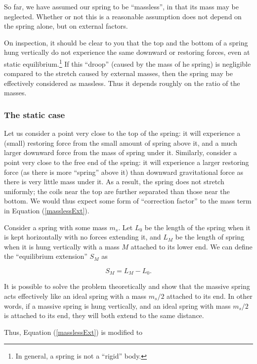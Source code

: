 \begin{refsection}
So far, we have assumed our spring to be ``massless'', in that its mass may be neglected. Whether or not this is a reasonable assumption does not depend on the spring alone, but on external factors. 

On inspection, it should be clear to you that the top and the bottom of a spring hung vertically do not experience the same downward or restoring forces, even at static equilibrium.\footnote{In general, a spring is not a ``rigid'' body.} If this ``droop'' (caused by the mass of he spring) is negligible compared to the stretch caused by external masses, then the spring may be effectively considered as massless. Thus it depends roughly on the ratio of the masses.


\subsubsection*{The static case}

Let us consider a point very close to the top of the spring: it will experience a (small) restoring force from the small amount of spring above it, and a much larger downward force from the mass of spring under it. Similarly, consider a point very close to the free end of the spring: it will experience a larger restoring force (as there is more ``spring'' above it) than downward gravitational force as there is very little mass under it. As a result, the spring does not stretch uniformly; the coils near the top are further separated than those near the bottom. We would thus expect some form of ``correction factor'' to the mass term in Equation (\ref{masslessExt}).

Consider a spring with some mass $m_s$. Let $L_0$ be the length of the spring when it is kept horizontally with no forces extending it, and $L_M$ be the length of spring when it is hung vertically with a mass $M$ attached to its lower end. We can define the ``equilibrium extension'' $S_M$ as

\begin{equation}
S_M = L_M - L_0.
\end{equation}

It is possible to solve the problem theoretically and show that the massive spring acts effectively like an ideal spring with a mass $m_s/2$ attached to its end. In other words, if a massive spring is hung vertically, and an ideal spring with mass $m_s/2$ is attached to its end, they will both extend to the same distance.

Thus, Equation (\ref{masslessExt}) is modified to


\end{refsection}
